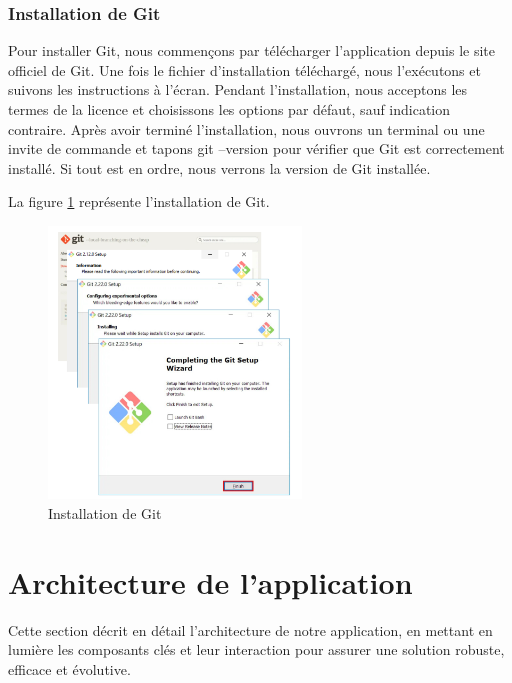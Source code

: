 \documentclass[12pt]{report}
\begin{document}
			\subsubsection{Installation de Git}

			\hspace{15pt} Pour installer Git, nous commençons par télécharger l'application depuis le site officiel de Git. Une fois le fichier d'installation téléchargé, nous l'exécutons et suivons les instructions à l'écran. Pendant l'installation, nous acceptons les termes de la licence et choisissons les options par défaut, sauf indication contraire. Après avoir terminé l'installation, nous ouvrons un terminal ou une invite de commande et tapons git --version pour vérifier que Git est correctement installé. Si tout est en ordre, nous verrons la version de Git installée.

			La figure \ref{fig:git} représente l’installation de Git.
			
			\begin{figure}[h]
				\centering
				\includegraphics[width=0.6\textwidth]{git.png}
				\caption{Installation de Git}
				\label{fig:git}
			\end{figure}
			\FloatBarrier


			\section{Architecture de l’application}

			\hspace{15pt} Cette section décrit en détail l'architecture de notre application, en mettant en lumière les composants clés et leur interaction pour assurer une solution robuste, efficace et évolutive.
\end{document}
